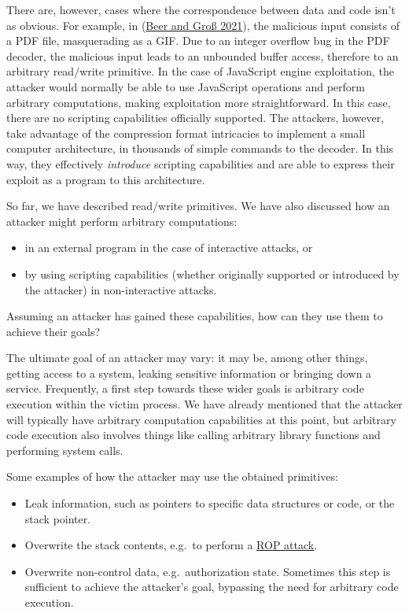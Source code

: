 \documentclass[
  a4paper,
]{report}
\providecommand{\tightlist}{%
  \setlength{\itemsep}{0pt}\setlength{\parskip}{0pt}}
\begin{document}
There are, however, cases where the correspondence between data and code
isn't as obvious. For example, in (\protect\hyperlink{ref-Beer2021}{Beer
and Groß 2021}), the malicious input consists of a PDF file,
masquerading as a GIF. Due to an integer overflow bug in the PDF
decoder, the malicious input leads to an unbounded buffer access,
therefore to an arbitrary read/write primitive. In the case of
JavaScript engine exploitation, the attacker would normally be able to
use JavaScript operations and perform arbitrary computations, making
exploitation more straightforward. In this case, there are no scripting
capabilities officially supported. The attackers, however, take
advantage of the compression format intricacies to implement a small
computer architecture, in thousands of simple commands to the decoder.
In this way, they effectively \emph{introduce} scripting capabilities
and are able to express their exploit as a program to this architecture.

So far, we have described read/write primitives. We have also discussed
how an attacker might perform arbitrary computations:

\begin{itemize}
\tightlist
\item
  in an external program in the case of interactive attacks, or
\item
  by using scripting capabilities (whether originally supported or
  introduced by the attacker) in non-interactive attacks.
\end{itemize}

Assuming an attacker has gained these capabilities, how can they use
them to achieve their goals?

The ultimate goal of an attacker may vary: it may be, among other
things, getting access to a system, leaking sensitive information or
bringing down a service. Frequently, a first step towards these wider
goals is arbitrary code execution within
the victim process. We have already mentioned that the attacker will
typically have arbitrary computation capabilities at this point, but
arbitrary code execution also involves things like calling arbitrary
library functions and performing system calls.

Some examples of how the attacker may use the obtained primitives:

\begin{itemize}
\tightlist
\item
  Leak information, such as pointers to specific data structures or
  code, or the stack pointer.
\item
  Overwrite the stack contents, e.g.~to perform a
  \protect\hyperlink{rop}{ROP attack}.
\item
  Overwrite non-control data, e.g.~authorization state. Sometimes this
  step is sufficient to achieve the attacker's goal, bypassing the need
  for arbitrary code execution.
\end{itemize}
\end{document}
